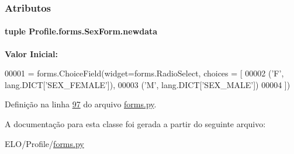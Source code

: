 \subsubsection{Atributos}
\hypertarget{classProfile_1_1forms_1_1SexForm_a0d99412ab99ee46149a50fabb2614845}{
\paragraph[{newdata}]{\setlength{\rightskip}{0pt plus 5cm}tuple Profile.\-forms.\-Sex\-Form.\-newdata\hspace{0.3cm}{\ttfamily [static]}}}\label{classProfile_1_1forms_1_1SexForm_a0d99412ab99ee46149a50fabb2614845}
{\bfseries Valor Inicial\-:}
\begin{DoxyCode}
00001 = forms.ChoiceField(widget=forms.RadioSelect, choices = [
00002                                             (\textcolor{stringliteral}{'F'}, lang.DICT[\textcolor{stringliteral}{'SEX\_FEMALE'}]),
00003                                             (\textcolor{stringliteral}{'M'}, lang.DICT[\textcolor{stringliteral}{'SEX\_MALE'}])
00004                                                 ])
\end{DoxyCode}


Definição na linha \hyperlink{Profile_2forms_8py_source_l00097}{97} do arquivo \hyperlink{Profile_2forms_8py_source}{forms.\-py}.



A documentação para esta classe foi gerada a partir do seguinte arquivo\-:\begin{DoxyCompactItemize}
\item 
E\-L\-O/\-Profile/\hyperlink{Profile_2forms_8py}{forms.\-py}\end{DoxyCompactItemize}
